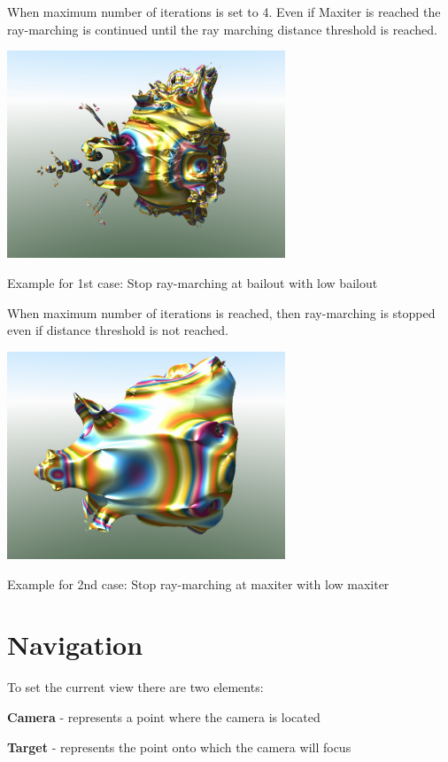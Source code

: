 When maximum number of iterations is set to 4. Even if Maxiter is
reached the ray-marching is continued until the ray marching distance
threshold is reached.

\includegraphics[width=3.26929in,height=2.44016in]{img/manual/media/image9.png}

Example for 1st case: Stop ray-marching at bailout with low bailout

When maximum number of iterations is reached, then ray-marching is
stopped even if distance threshold is not reached.

\includegraphics[width=3.26890in,height=2.44016in]{img/manual/media/image10.png}\protect\hypertarget{__RefHeading___Toc1473_2059392462}{}{}

Example for 2nd case: Stop ray-marching at maxiter with low maxiter

\section{Navigation}\label{navigation}

To set the current view there are two elements:

\textbf{Camera} - represents a point where the camera is located

\textbf{Target} - represents the point onto which the camera will focus

